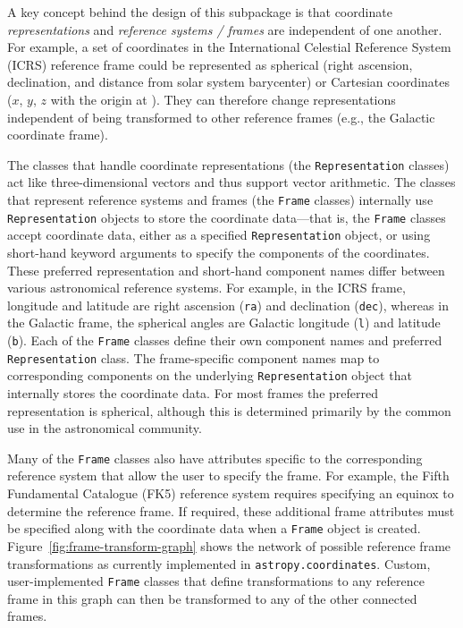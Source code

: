 \documentclass[modern]{aastex61}
\renewcommand{\figurename}{Figure\xspace}
\begin{document}
A key concept behind the design of this subpackage is that coordinate
\textit{representations} and \textit{reference systems / frames} are independent
of one another.
For example, a set of coordinates in the International Celestial Reference
System (ICRS) reference frame could be represented as spherical (right
ascension, declination, and distance from solar system barycenter) or Cartesian
coordinates ($x$, $y$, $z$ with the origin at ).
They can therefore change representations independent of being transformed to
other reference frames (e.g., the Galactic coordinate frame).

The classes that handle coordinate representations (the \texttt{Representation}
classes) act like three-dimensional vectors and thus support vector arithmetic.
The classes that represent reference systems and frames (the \texttt{Frame}
classes) internally use \texttt{Representation} objects to store the coordinate
data---that is, the \texttt{Frame} classes accept coordinate data, either as a
specified \texttt{Representation} object, or using short-hand keyword arguments
to specify the components of the coordinates.
These preferred representation and short-hand component names differ between
various astronomical reference systems.
For example, in the ICRS frame, longitude and latitude are right ascension
(\texttt{ra}) and declination (\texttt{dec}), whereas in the Galactic frame, the
spherical angles are Galactic longitude (\texttt{l}) and latitude (\texttt{b}).
Each of the \texttt{Frame} classes define their own component names and
preferred \texttt{Representation} class.
The frame-specific component names map to corresponding components on the
underlying \texttt{Representation} object that internally stores the coordinate
data.
For most frames the preferred representation is spherical, although this is
determined primarily by the common use in the astronomical community.

Many of the \texttt{Frame} classes also have attributes specific to the
corresponding reference system that allow the user to specify the frame.
For example, the Fifth Fundamental Catalogue (FK5) reference system requires
specifying an equinox to determine the reference frame.
If required, these additional frame attributes must be specified along with the
coordinate data when a \texttt{Frame} object is created.
\figurename~\ref{fig:frame-transform-graph} shows the network of possible
reference frame transformations as currently implemented in
\texttt{astropy.coordinates}.
Custom, user-implemented \texttt{Frame} classes that define transformations to
any reference frame in this graph can then be transformed to any of the other
connected frames.
\end{document}
